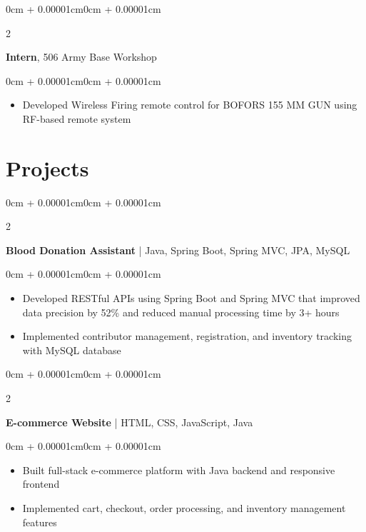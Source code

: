 \documentclass[11pt, letterpaper]{article}
\newenvironment{highlights}{
    \begin{itemize}[topsep=0.05cm, parsep=0.05cm, partopsep=0pt, itemsep=0pt, leftmargin=0cm + 8pt]
}{
    \end{itemize}
}
\newenvironment{onecolentry}{
    \begin{adjustwidth}{0cm + 0.00001cm}{0cm + 0.00001cm}
}{
    \end{adjustwidth}
}
\newenvironment{twocolentry}[2][]{
    \onecolentry
    \def\secondColumn{#2}
    \setcolumnwidth{\fill, 4.2cm}
    \begin{paracol}{2}
}{
    \switchcolumn \raggedleft \secondColumn
    \end{paracol}
    \endonecolentry
}
\begin{document}
    \vspace{0.1cm}

    \begin{twocolentry}{2022}
        \textbf{Intern}, 506 Army Base Workshop
    \end{twocolentry}

    \vspace{0.05cm}
    \begin{onecolentry}
        \begin{highlights}
            \item Developed Wireless Firing remote control for BOFORS 155 MM GUN using RF-based remote system
        \end{highlights}
    \end{onecolentry}

    \newpage

    \section{Projects}

    \begin{twocolentry}{2023}
        \textbf{Blood Donation Assistant} | Java, Spring Boot, Spring MVC, JPA, MySQL
    \end{twocolentry}

    \vspace{0.05cm}
    \begin{onecolentry}
        \begin{highlights}
            \item Developed RESTful APIs using Spring Boot and Spring MVC that improved data precision by 52\% and reduced manual processing time by 3+ hours
            \item Implemented contributor management, registration, and inventory tracking with MySQL database
        \end{highlights}
    \end{onecolentry}

    \vspace{0.1cm}

    \begin{twocolentry}{2022}
        \textbf{E-commerce Website} | HTML, CSS, JavaScript, Java
    \end{twocolentry}

    \vspace{0.05cm}
    \begin{onecolentry}
        \begin{highlights}
            \item Built full-stack e-commerce platform with Java backend and responsive frontend
            \item Implemented cart, checkout, order processing, and inventory management features
        \end{highlights}
    \end{onecolentry}
\end{document}

